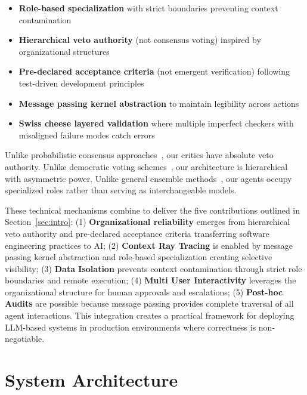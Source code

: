 \documentclass[sigconf]{acmart}
\begin{document}
\begin{itemize}
  \item \textbf{Role-based specialization} with strict boundaries preventing context contamination
  \item \textbf{Hierarchical veto authority} (not consensus voting) inspired by organizational structures
  \item \textbf{Pre-declared acceptance criteria} (not emergent verification) following test-driven development principles
  \item \textbf{Message passing kernel abstraction} to maintain legibility across actions
  \item \textbf{Swiss cheese layered validation} where multiple imperfect checkers with misaligned failure modes catch errors
\end{itemize}

Unlike probabilistic consensus approaches~\cite{Naik2024}, our critics have absolute veto authority. Unlike democratic voting schemes~\cite{Kamen2025}, our architecture is hierarchical with asymmetric power. Unlike general ensemble methods~\cite{Chen2025LLMEnsemble}, our agents occupy specialized roles rather than serving as interchangeable models.

These technical mechanisms combine to deliver the five contributions outlined in Section~\ref{sec:intro}: (1) \textbf{Organizational reliability} emerges from hierarchical veto authority and pre-declared acceptance criteria transferring software engineering practices to AI; (2) \textbf{Context Ray Tracing} is enabled by message passing kernel abstraction and role-based specialization creating selective visibility; (3) \textbf{Data Isolation} prevents context contamination through strict role boundaries and remote execution; (4) \textbf{Multi User Interactivity} leverages the organizational structure for human approvals and escalations; (5) \textbf{Post-hoc Audits} are possible because message passing provides complete traversal of all agent interactions. This integration creates a practical framework for deploying LLM-based systems in production environments where correctness is non-negotiable.

\section{System Architecture}
\label{sec:architecture}
\end{document}
